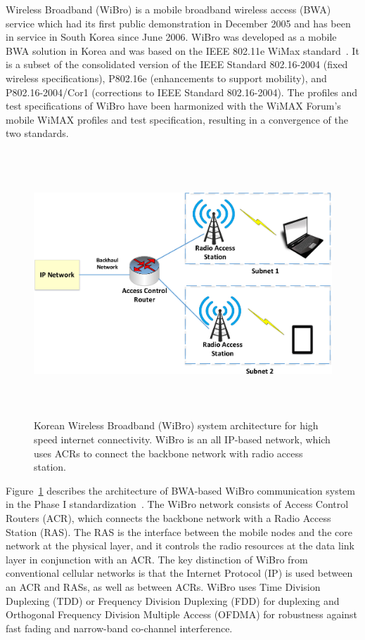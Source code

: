 Wireless Broadband (WiBro) is a mobile broadband wireless access (BWA) service which had its first public demonstration in December 2005 and has been in service in South Korea since June 2006. WiBro was developed as a mobile BWA solution in Korea and was based on the IEEE 802.11e WiMax standard~\cite{wibro}. It is a subset of the consolidated version of the IEEE Standard 802.16-2004 (fixed wireless specifications), P802.16e (enhancements to support mobility), and P802.16-2004/Cor1 (corrections to IEEE Standard 802.16-2004). The profiles and test specifications of WiBro have been harmonized with the WiMAX Forum's mobile WiMAX profiles and test specification, resulting in a convergence of the two standards.


\begin{figure}[!ht]
\centering
\includegraphics[width=\textwidth,height=10cm,keepaspectratio]{images/Gill/5G/wibro.eps} 
\caption{Korean Wireless Broadband (WiBro) system architecture for high speed internet connectivity. WiBro is an all IP-based network, which uses ACRs to connect the backbone network with radio access station.}
\label{wibro}
\end{figure}

Figure~\ref{wibro} describes the architecture of BWA-based WiBro communication system in the Phase I standardization~\cite{wibro}. The WiBro network consists of Access Control Routers (ACR), which connects the backbone network with a Radio Access Station (RAS). The RAS is the interface between the mobile nodes and the core network at the physical layer, and it controls the radio resources at the data link layer in conjunction with an ACR. The key distinction of WiBro from conventional cellular networks is that the Internet Protocol (IP) is used between an ACR and RASs, as well as between ACRs. WiBro uses Time Division Duplexing (TDD) or Frequency Division Duplexing (FDD) for duplexing and Orthogonal Frequency Division Multiple Access (OFDMA) for robustness against fast fading and narrow-band co-channel interference.


